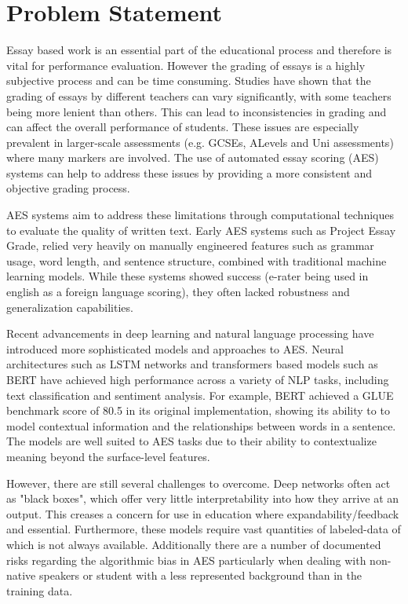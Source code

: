 \documentclass[11pt]{article}
\begin{document}
\section*{Problem Statement}
Essay based work is an essential part of the educational process and therefore is vital for performance evaluation. However
the grading of essays is a highly subjective process and can be time consuming. Studies have shown that the grading of essays
by different teachers can vary significantly, with some teachers being more lenient than others. This can lead to inconsistencies
in grading and can affect the overall performance of students. These issues are especially prevalent in larger-scale assessments 
(e.g. GCSEs, ALevels and Uni assessments) where many markers are involved. The use of automated essay scoring (AES) systems can help 
to address these issues by providing a more consistent and objective grading process.

AES systems aim to address these limitations through computational techniques to evaluate the quality of written text. Early AES systems 
such as Project Essay Grade, relied very heavily on manually engineered features such as grammar usage, word length, and sentence structure, combined with
traditional machine learning models. While these systems showed success (e-rater being used in english as a foreign language scoring), they often lacked
robustness and generalization capabilities.

Recent advancements in deep learning and natural language processing have introduced more sophisticated models and approaches to AES.
Neural architectures such as LSTM networks and transformers based models such as BERT have achieved high performance across a variety of NLP tasks, 
including text classification and sentiment analysis. For example, BERT achieved a GLUE benchmark score of 80.5 in its original implementation, showing its
ability to to model contextual information and the relationships between words in a sentence. The models are well suited to AES tasks due to their ability to 
contextualize meaning beyond the surface-level features.

However, there are still several challenges to overcome. Deep networks often act as "black boxes", which offer very little interpretability into how they arrive
at an output. This creases a concern for use in education where expandability/feedback and essential. Furthermore, these models require vast quantities of 
labeled-data of which is not always available. Additionally there are a number of documented risks regarding the algorithmic bias in AES particularly when
dealing with non-native speakers or student with a less represented background than in the training data.
\end{document}
